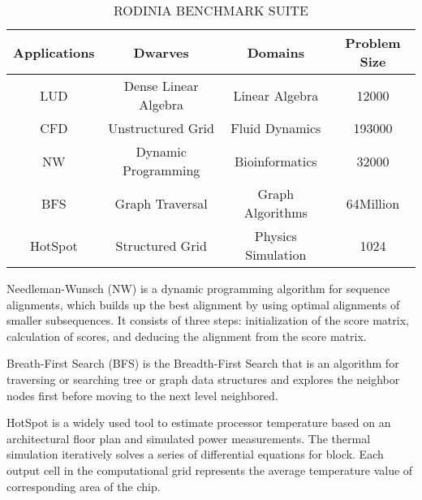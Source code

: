 \begin{table}[htbp]
  \centering
    \caption{RODINIA BENCHMARK SUITE}
  \begin{adjustbox}{width=0.5\textwidth}
    \begin{tabular}{cccc}
    \toprule
    Applications & Dwarves & Domains & Problem Size  \\
    \midrule
    LUD & Dense Linear Algebra & Linear Algebra & 12000 \\
    CFD & Unstructured Grid & Fluid Dynamics & 193000 \\
    NW & Dynamic Programming & Bioinformatics & 32000 \\
    BFS & Graph Traversal & Graph Algorithms & 64Million \\
    HotSpot & Structured Grid & Physics Simulation & 1024 \\
    \bottomrule
    \end{tabular}%
    \label{tab:benchmarks}
  \end{adjustbox}

\end{table}%


  Needleman-Wunsch (NW) is a dynamic programming algorithm for sequence alignments, which builds up the best alignment by using optimal alignments of smaller subsequences. It consists of three steps: initialization of the score matrix, calculation of scores, and deducing the alignment from the score matrix.

  Breath-First Search (BFS) is the Breadth-First Search that is an algorithm for traversing or searching tree or graph data structures and explores the neighbor nodes first before moving to the next level neighbored.

  HotSpot is a widely used tool to estimate processor temperature based on an architectural floor plan and simulated power measurements. The thermal simulation iteratively solves a series of differential equations for block. Each output cell in the computational grid represents the average temperature value of corresponding area of the chip.